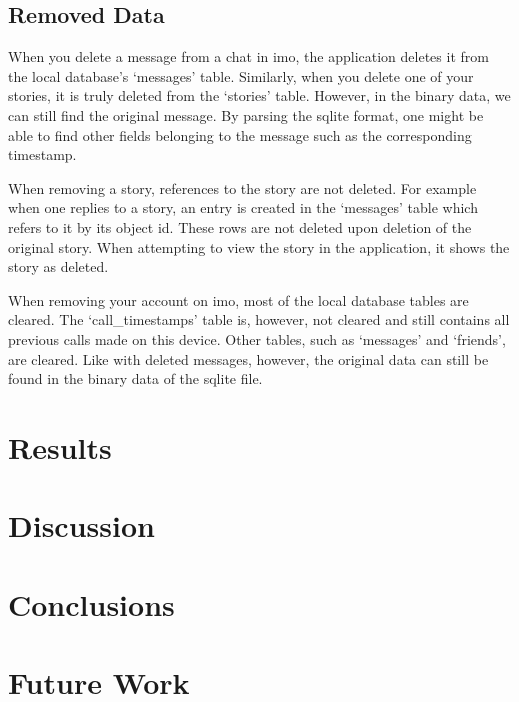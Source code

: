 \documentclass[conference]{IEEEtran}
\begin{document}
\subsection{Removed Data}

When you delete a message from a chat in imo, the application deletes it from
the local database's `messages' table. Similarly, when you delete one of your
stories, it is truly deleted from the `stories' table. However, in the binary
data, we can still find the original message. By parsing the sqlite format, one
might be able to find other fields belonging to the message such as the
corresponding timestamp.

When removing a story, references to the story are not deleted. For example
when one replies to a story, an entry is created in the `messages' table which
refers to it by its object id. These rows are not deleted upon deletion of the
original story. When attempting to view the story in the application, it shows
the story as deleted.

When removing your account on imo, most of the local database tables are
cleared. The `call\_timestamps' table is, however, not cleared and still
contains all previous calls made on this device. Other tables, such as
`messages' and `friends', are cleared. Like with deleted messages, however, the
original data can still be found in the binary data of the sqlite file.

\section{Results}\label{sec:results}

\section{Discussion}\label{sec:disc}

\section{Conclusions}\label{sec:conc}

\section{Future Work}\label{sec:futwork}


%
\end{document}
